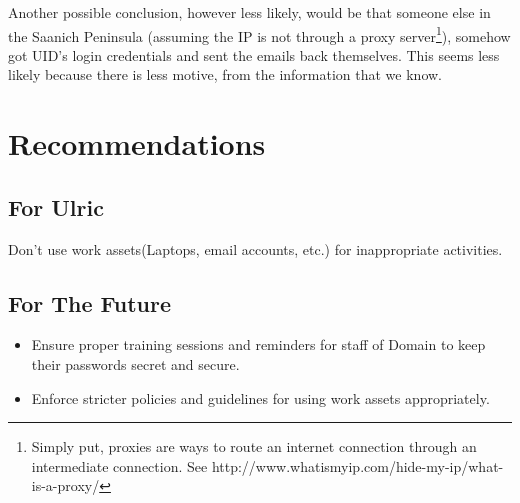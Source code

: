 \documentclass{article}
\numberwithin{equation}{section} %
\numberwithin{figure}{section} %
\numberwithin{table}{section} %
\begin{document}
Another possible conclusion, however less likely, would be that someone else in the Saanich Peninsula (assuming the IP is not through a proxy server\footnote{Simply put, proxies are ways to route an internet connection through an intermediate connection.  See http://www.whatismyip.com/hide-my-ip/what-is-a-proxy/}), somehow got UID's login credentials and sent the emails back themselves.  This seems less likely because there is less motive, from the information that we know.  

\section{Recommendations}
\subsection{For Ulric}
Don't use work assets(Laptops, email accounts, etc.) for inappropriate activities.

\subsection{For The Future}
\begin{itemize}
	\item Ensure proper training sessions and reminders for staff of Domain to keep their passwords secret and secure.
	\item Enforce stricter policies and guidelines for using work assets appropriately.
\end{itemize}

 

\end{document}
